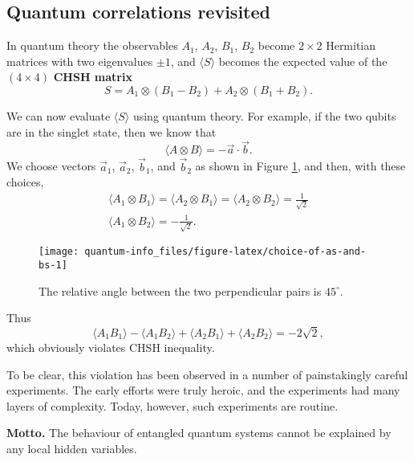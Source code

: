 \documentclass{article}
\newenvironment{idea}%
{\bigskip\noindent\begin{minipage}{\textwidth}\smallskip\begin{tcolorbox}[colback=gray!10,boxrule=0.01mm]}%
{\end{tcolorbox}\end{minipage}\bigskip}
\begin{document}
\hypertarget{quantum-correlations-revisited}{%
\subsection{Quantum correlations revisited}\label{quantum-correlations-revisited}}

In quantum theory the observables \(A_1\), \(A_2\), \(B_1\), \(B_2\) become \(2\times 2\) Hermitian matrices with two eigenvalues \(\pm 1\), and \(\langle S\rangle\) becomes the expected value of the \((4\times 4)\) \textbf{CHSH matrix}
\[
  S
  = A_1\otimes(B_1-B_2) + A_2\otimes(B_1+B_2).
\]

We can now evaluate \(\langle S\rangle\) using quantum theory.
For example, if the two qubits are in the singlet state, then we know that
\[
  \langle A\otimes B\rangle = -\vec{a}\cdot\vec{b}.
\]
We choose vectors \(\vec{a}_1\), \(\vec{a}_2\), \(\vec{b}_1\), and \(\vec{b}_2\) as shown in Figure \ref{fig:choice-of-as-and-bs}, and then, with these choices,
\[
\begin{gathered}
  \langle A_1\otimes B_1\rangle
  = \langle A_2\otimes B_1\rangle
  = \langle A_2\otimes B_2\rangle
  = \frac{1}{\sqrt 2}
\\\langle A_1\otimes B_2\rangle
   = -\frac{1}{\sqrt 2}.
\end{gathered}
\]



\begin{figure}[H]

{\centering \texttt{[image: quantum-info\_files/figure-latex/choice-of-as-and-bs-1]} 

}

\caption{The relative angle between the two perpendicular pairs is \(45^\circ\).}\label{fig:choice-of-as-and-bs}
\end{figure}

Thus
\[
  \langle A_1 B_1\rangle - \langle A_1 B_2\rangle + \langle A_2 B_1\rangle + \langle A_2 B_2\rangle
  = -2\sqrt{2},
\]
which obviously violates CHSH inequality.

To be clear, this violation has been observed in a number of painstakingly careful experiments.
The early efforts were truly heroic, and the experiments had many layers of complexity.
Today, however, such experiments are routine.

\begin{idea}

\textbf{Motto.} The behaviour of entangled quantum systems cannot be explained by any local hidden variables.

\end{idea}
\end{document}
